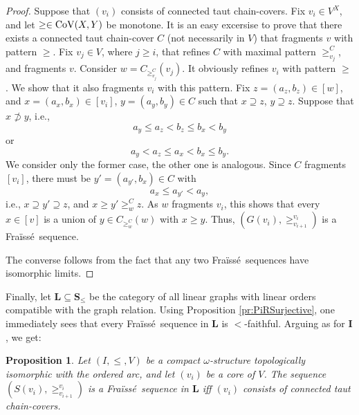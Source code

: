 \documentclass[12pt]{amsart}
\theoremstyle{plain}
\newtheorem{lemma}[theorem]{Lemma}
\newtheorem{proposition}[theorem]{\bf Proposition}
\newcommand \Val{{\rm{CoV}}}
\newcommand \fra{Fra\"{i}ss\'{e}}
\newcommand \IIf{\mathbf{I}}
\newcommand \LLf{\mathbf{L}}
\newcommand \SSf{\mathbf{S}}
\newcommand \NN{\mathbb{N}}
\begin{document}
\begin{proof}
Suppose that $(v_i)$ consists of connected taut chain-covers. Fix $v_i \in V^{X}$, and let $\geq \in \Val(X,Y)$ be monotone. It is an easy excersise to prove that there exists a connected taut chain-cover $C$ (not necessarily in $V$) that fragments $v$ with pattern $\geq$. Fix $v_j \in V$, where $j \geq i$, that refines $C$ with maximal pattern $\geq^C_{v_j}$, and fragments $v$. Consider $w=C_{\geq^C_{v_j}}(v_j)$. It obviously refines $v_i$ with  pattern $\geq$. We show that it also fragments $v_i$ with this pattern. Fix $z=(a_z,b_z) \in [w]$, and $x=(a_x,b_x) \in [v_i]$, $y=(a_y,b_y) \in C$  such that $x \supseteq z$, $y \supseteq z$. Suppose that $x \not \supset y$, i.e., $$a_y\leq a_z<b_z \leq b_x<b_y$$ or $$a_y <a_z \leq a_x< b_x \leq b_y.$$ We consider only the former case, the other one is analogous. Since $C$ fragments $[v_i]$, there must be $y'=(a_{y'},b_x) \in C$ with $$a_x \leq a_{y'}<a_y,$$ i.e., $x \supseteq y' \supseteq z$, and $x \geq y' \geq^C_w z$. As $w$ fragments $v_i$, this shows that every $x \in [v]$ is a union of $y \in C_{\geq^C_w}(w)$ with $x \geq y$. Thus, $(G(v_i), \geq^{v_i}_{v_{i+1}})$  is a \fra \  sequence.

The converse follows from the fact that any two \fra \  sequences have isomorphic limits.
\end{proof}

Finally, let $\LLf \subseteq \SSf_{\leq}$ be the category of all linear graphs with linear orders compatible with the graph relation. Using Proposition \ref{pr:PiRSurjective}, one immediately sees that every \fra \ sequence in $\LLf$ is $<$-faithful. Arguing as for $\IIf$, we get:

\begin{proposition}
Let $(I,\leq, V)$ be a compact $\omega$-structure topologically isomorphic with the ordered arc, and let $(v_i)$ be a core of $V$. The sequence $(S(v_i), \geq^{v_i}_{v_{i+1}})$ is a \fra \  sequence in $\LLf$ iff $(v_i)$ consists of connected taut chain-covers.

\end{proposition}


\end{document}
